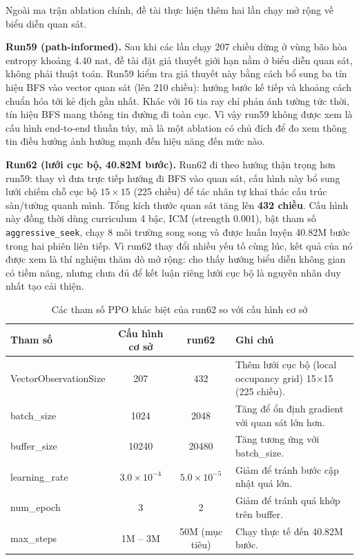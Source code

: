 Ngoài ma trận ablation chính, đề tài thực hiện thêm hai lần chạy mở rộng 
về biểu diễn quan sát.

\textbf{Run59 (path-informed).} Sau khi các lần chạy 207 chiều dừng ở vùng bão hòa entropy khoảng 4.40 nat, đề tài đặt giả thuyết giới hạn nằm ở biểu diễn quan sát, không phải thuật toán. Run59 kiểm tra giả thuyết này bằng cách bổ sung ba tín hiệu BFS vào vector quan sát (lên 210 chiều): hướng bước kế tiếp và khoảng cách chuẩn hóa tới kẻ địch gần nhất. Khác với 16 tia ray chỉ phản ánh tường tức thời, tín hiệu BFS mang thông tin đường đi toàn cục. Vì vậy run59 không được xem là cấu hình end-to-end thuần túy, mà là một ablation có chủ đích để đo xem thông tin điều hướng ảnh hưởng mạnh đến hiệu năng đến mức nào.

\textbf{Run62 (lưới cục bộ, 40.82M bước).} Run62 đi theo hướng thận trọng hơn run59: thay vì đưa trực tiếp hướng đi BFS vào quan sát, cấu hình này bổ sung lưới chiếm chỗ cục bộ $15\times15$ (225 chiều) để tác nhân tự khai thác cấu trúc sàn/tường quanh mình. Tổng kích thước quan sát tăng lên \textbf{432 chiều}. Cấu hình này đồng thời dùng curriculum 4 bậc, ICM (strength 0.001), bật tham số \texttt{aggressive\_seek}, chạy 8 môi trường song song và được huấn luyện 40.82M bước trong hai phiên liên tiếp. Vì run62 thay đổi nhiều yếu tố cùng lúc, kết quả của nó được xem là thí nghiệm thăm dò mở rộng: cho thấy hướng biểu diễn không gian có tiềm năng, nhưng chưa đủ để kết luận riêng lưới cục bộ là nguyên nhân duy nhất tạo cải thiện.

\begin{table}[H]
    \centering
    \small
    \caption{Các tham số PPO khác biệt của run62 so với cấu hình cơ sở}
    \label{tab:run62_ppo_config}
    \begin{tabular}{|p{4cm}|c|c|p{5cm}|}
        \hline
        \textbf{Tham số} & \textbf{Cấu hình cơ sở} & \textbf{run62} & \textbf{Ghi chú} \\
        \hline
        VectorObservationSize & 207 & 432 & Thêm lưới cục bộ (local occupancy grid) 15$\times$15 (225 chiều). \\
        \hline
        batch\_size & 1024 & 2048 & Tăng để ổn định gradient với quan sát lớn hơn. \\
        \hline
        buffer\_size & 10240 & 20480 & Tăng tương ứng với batch\_size. \\
        \hline
        learning\_rate & $3.0 \times 10^{-4}$ & $5.0 \times 10^{-5}$ & Giảm để tránh bước cập nhật quá lớn. \\
        \hline
        num\_epoch & 3 & 2 & Giảm để tránh quá khớp trên buffer. \\
        \hline
        max\_steps & 1M -- 3M & 50M (mục tiêu) & Chạy thực tế đến 40.82M bước. \\
        \hline
    \end{tabular}
\end{table}
